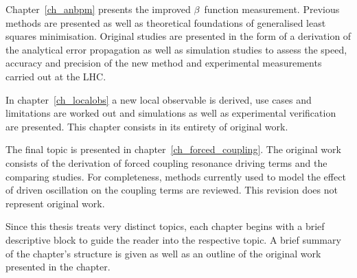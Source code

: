 Chapter~\ref{ch_anbpm} presents the improved $\beta$~function measurement. Previous methods are presented
as well as theoretical foundations of generalised least squares minimisation.
Original studies are presented in the form of a derivation of the analytical error propagation as well as 
simulation studies to assess the speed, accuracy and precision of the new method and experimental
measurements carried out at the LHC.

In chapter~\ref{ch_localobs} a new local observable is derived, use cases and limitations are worked out and
simulations as well as experimental verification are presented. This chapter consists in its entirety of 
original work.

The final topic is presented in chapter~\ref{ch_forced_coupling}. The original work consists of the
derivation of forced coupling resonance driving terms and the comparing studies. For completeness,
methods currently used to model the effect of driven oscillation on the coupling terms are reviewed.
This revision does not represent original work.

Since this thesis treats very distinct topics, each chapter begins with a brief descriptive block to guide
the reader into the respective topic. A brief summary of the chapter's structure is given as well as
an outline of the original work presented in the chapter. 